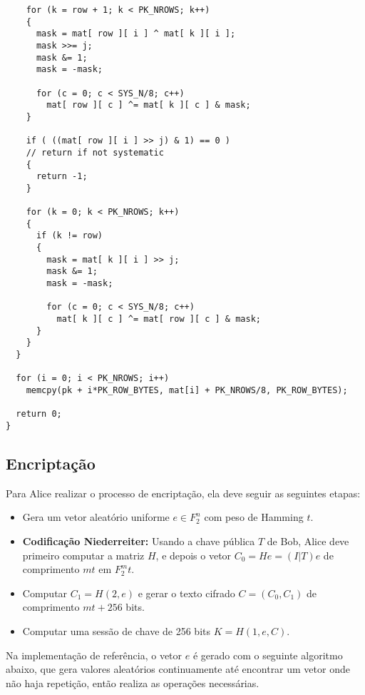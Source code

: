 \begin{verbatim}
    for (k = row + 1; k < PK_NROWS; k++)
    {
      mask = mat[ row ][ i ] ^ mat[ k ][ i ];
      mask >>= j;
      mask &= 1;
      mask = -mask;

      for (c = 0; c < SYS_N/8; c++)
        mat[ row ][ c ] ^= mat[ k ][ c ] & mask;
    }

    if ( ((mat[ row ][ i ] >> j) & 1) == 0 ) 
    // return if not systematic
    {
      return -1;
    }

    for (k = 0; k < PK_NROWS; k++)
    {
      if (k != row)
      {
        mask = mat[ k ][ i ] >> j;
        mask &= 1;
        mask = -mask;

        for (c = 0; c < SYS_N/8; c++)
          mat[ k ][ c ] ^= mat[ row ][ c ] & mask;
      }
    }
  }

  for (i = 0; i < PK_NROWS; i++)
    memcpy(pk + i*PK_ROW_BYTES, mat[i] + PK_NROWS/8, PK_ROW_BYTES);

  return 0;
}
\end{verbatim}

\subsection{Encriptação}

Para Alice realizar o processo de encriptação, ela deve seguir as seguintes etapas:

\begin{itemize}
    \item Gera um vetor aleatório uniforme  $e \in {F}_{2}^n$ com peso de Hamming $t$.
    
    \item \textbf{Codificação Niederreiter:} Usando a chave pública $T$ de Bob, Alice deve primeiro computar a matriz $H$, e depois o vetor $C_0 = He = (I | T)e$ de comprimento $mt$ em ${F}_{2}^mt$.
    
    \item Computar $C_1 = H(2, e)$ e gerar o texto cifrado $C = (C_0, C_1)$ de comprimento $mt + 256$ bits.
    
    \item Computar uma sessão de chave de 256 bits $K = H(1, e, C)$.
\end{itemize}

Na implementação de referência, o vetor $e$ é gerado com o seguinte algoritmo abaixo, que gera valores aleatórios continuamente até encontrar um vetor onde não haja repetição, então realiza as operações necessárias.

